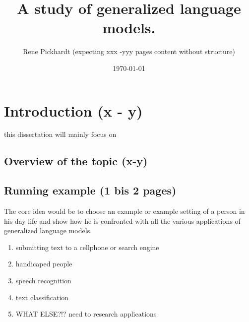 \documentclass[•]{book}
\title{A study of generalized language models.}
\author{Rene Pickhardt (expecting xxx -yyy pages content without structure)}
\date{\today}
\begin{document}
\maketitle
\tableofcontents



\newcommand{\todo}[1]{\textcolor{red}{\textbf{TODO}: #1}}
\newcommand{\rp}[1]{\textcolor{blue}{Rene: #1}}



\chapter{Introduction (x - y)}
this dissertation will mainly focus on \cite{own:typology:2013}
\section{Overview of the topic (x-y)}

\section{Running example (1 bis 2 pages)}
The core idea would be to choose an example or example setting of a person in his day life and show how he is confronted with all the various applications of generalized language models.
\begin{enumerate}
\item submitting text to a cellphone or search engine
\item handicaped people
\item speech recognition
\item text classification
\item WHAT ELSE?!? need to research applications
\end{enumerate}
\end{document}
